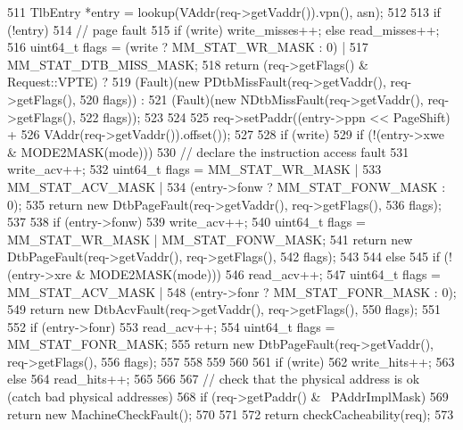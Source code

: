 \begin{DoxyCode}
{{{511             TlbEntry *entry = lookup(VAddr(req->getVaddr()).vpn(), asn);
512 
513             if (!entry) {
514                 // page fault
515                 if (write) { write_misses++; } else { read_misses++; }
516                 uint64_t flags = (write ? MM_STAT_WR_MASK : 0) |
517                     MM_STAT_DTB_MISS_MASK;
518                 return (req->getFlags() & Request::VPTE) ?
519                     (Fault)(new PDtbMissFault(req->getVaddr(), req->getFlags(),
520                                               flags)) :
521                     (Fault)(new NDtbMissFault(req->getVaddr(), req->getFlags(),
522                                               flags));
523             }
524 
525             req->setPaddr((entry->ppn << PageShift) +
526                           VAddr(req->getVaddr()).offset());
527 
528             if (write) {
529                 if (!(entry->xwe & MODE2MASK(mode))) {
530                     // declare the instruction access fault
531                     write_acv++;
532                     uint64_t flags = MM_STAT_WR_MASK |
533                         MM_STAT_ACV_MASK |
534                         (entry->fonw ? MM_STAT_FONW_MASK : 0);
535                     return new DtbPageFault(req->getVaddr(), req->getFlags(),
536                                             flags);
537                 }
538                 if (entry->fonw) {
539                     write_acv++;
540                     uint64_t flags = MM_STAT_WR_MASK | MM_STAT_FONW_MASK;
541                     return new DtbPageFault(req->getVaddr(), req->getFlags(),
542                                             flags);
543                 }
544             } else {
545                 if (!(entry->xre & MODE2MASK(mode))) {
546                     read_acv++;
547                     uint64_t flags = MM_STAT_ACV_MASK |
548                         (entry->fonr ? MM_STAT_FONR_MASK : 0);
549                     return new DtbAcvFault(req->getVaddr(), req->getFlags(),
550                                            flags);
551                 }
552                 if (entry->fonr) {
553                     read_acv++;
554                     uint64_t flags = MM_STAT_FONR_MASK;
555                     return new DtbPageFault(req->getVaddr(), req->getFlags(),
556                                             flags);
557                 }
558             }
559         }
560 
561         if (write)
562             write_hits++;
563         else
564             read_hits++;
565     }
566 
567     // check that the physical address is ok (catch bad physical addresses)
568     if (req->getPaddr() & ~PAddrImplMask) {
569         return new MachineCheckFault();
570     }
571 
572     return checkCacheability(req);
573 }
\end{DoxyCode}
